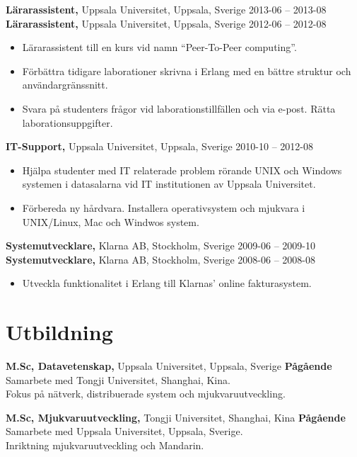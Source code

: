 \documentclass[margin]{res}
\begin{document}
\begin{resume}
{\bf Lärarassistent,} Uppsala Universitet, Uppsala, Sverige \hfill 2013-06 -- 2013-08\\
{\bf Lärarassistent,} Uppsala Universitet, Uppsala, Sverige \hfill 2012-06 -- 2012-08
 \begin{itemize} \itemsep -2pt  %
 \item Lärarassistent till en kurs vid namn ``Peer-To-Peer computing''.
 \item Förbättra tidigare laborationer skrivna i Erlang med en bättre struktur och användargränssnitt.
 \item Svara på studenters frågor vid laborationstillfällen och via e-post. Rätta laborationsuppgifter.
 \end{itemize}

{\bf IT-Support,} Uppsala Universitet, Uppsala, Sverige \hfill 2010-10 -- 2012-08
 \begin{itemize} \itemsep -2pt  %
 \item Hjälpa studenter med IT relaterade problem rörande UNIX och
   Windows systemen i datasalarna vid IT institutionen av Uppsala Universitet.
 \item Förbereda ny hårdvara. Installera operativsystem och mjukvara i UNIX/Linux, Mac och Windwos system.
 \end{itemize}

{\bf Systemutvecklare,} Klarna AB, Stockholm, Sverige \hfill 2009-06 -- 2009-10\\
{\bf Systemutvecklare,} Klarna AB, Stockholm, Sverige \hfill 2008-06 -- 2008-08
 \begin{itemize} \itemsep -2pt  %
 \item Utveckla funktionalitet i Erlang till Klarnas' online fakturasystem.
 \end{itemize}

\section{Utbildning}
{\bf M.Sc,  Datavetenskap,} Uppsala Universitet, Uppsala, Sverige \hfill \textbf{Pågående} \\
Samarbete med Tongji Universitet, Shanghai, Kina. \\
Fokus på nätverk, distribuerade system och mjukvaruutveckling.

{\bf M.Sc, Mjukvaruutveckling,} Tongji Universitet, Shanghai, Kina \hfill \textbf{Pågående} \\
Samarbete med Uppsala Universitet, Uppsala, Sverige. \\
Inriktning mjukvaruutveckling och Mandarin.


\end{resume}
\end{document}
